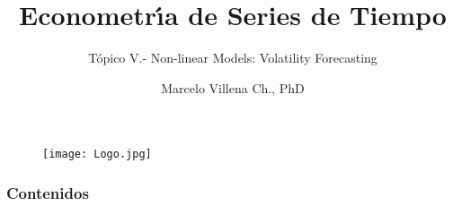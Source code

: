\documentclass[xcolor=(list of options)]{beamer}
\title[ECO -TS101]{Econometr\'\i{}a de Series de Tiempo}
\subtitle{T\'opico V.- Non-linear Models: Volatility Forecasting}
\author{Marcelo Villena Ch., PhD}
\institute[UAI] %
{
Universidad Adolfo Ib\'a\~nez 
 \\ %
\medskip
}
\date{} %
\begin{document}
\begin{frame}

\begin{figure}[t!]
\texttt{[image: Logo.jpg]}
\end{figure}
\titlepage %
\end{frame}

\begin{frame}
\frametitle{Contenidos} 
\tableofcontents %
\end{frame}



\end{document}
